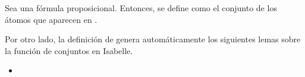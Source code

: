 \begin{isabellebody}
\begin{isamarkuptext}
  \begin{definicion}
    Sea  una fórmula proposicional. Entonces, se define  como el conjunto de 
    los átomos que aparecen en .
  \end{definicion}

  Por otro lado, la definición de  genera automáticamente los siguientes lemas 
  sobre la función de conjuntos  en Isabelle.
  
  \begin{itemize}
    \item[] 
  \end{itemize} 


\end{isamarkuptext}
\end{isabellebody}
